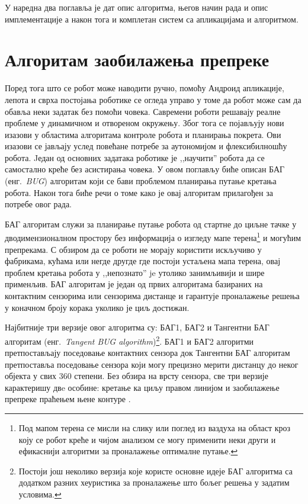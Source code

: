 \documentclass[12pt,oneside]{memoir}
\theoremstyle{remark}
\begin{document}
У наредна два поглавља је дат опис алгоритма, његов начин рада и опис имплементације а након тога и комплетан систем са апликацијама и алгоритмом.

\chapter{Алгоритам заобилажења препреке}
\label{chp:algoritam}
Поред тога што се робот може наводити ручно, помоћу Андроид апликације, лепота и сврха постојања роботике се огледа управо у томе да робот може сам да обавља неки задатак без помоћи човека. Савремени роботи решавају реалне проблеме у динамичном и отвореном окружењу. Због тога се појављују нови изазови у областима алгоритама контроле робота и планирања покрета. Ови изазови се јављају услед повећане потребе за аутономијом и флексибилношћу робота. Jедан од основних задатака роботике је ,,научити'' робота да се самостално креће без асистирања човека. У овом поглављу биће описан БАГ (енг.~{\em BUG}) алгоритам који се бави проблемом планирања путање кретања робота. Након тога биће речи о томе како је овај алгоритам прилагођен за потребе овог рада.

БАГ алгоритам служи за планирање путање робота од стартне до циљне тачке у дводимензионалном простору без информација о изгледу мапе терена\footnote{Под мапом терена се мисли на слику или поглед из ваздуха на област кроз коју се робот креће и чијом анализом се могу применити неки други и ефикаснији алгоритми за проналажење оптималне путање.} и могућим препрекама. С обзиром да се роботи не морају користити искључиво у фабрикама, кућама или негде другде где постоји устаљена мапа терена, овај проблем кретања робота у ,,непознато'' je утолико занимљивији и шире применљив. БАГ алгоритам је један од првих алгоритама  базираних на контактним сензорима или сензорима дистанце и гарантује проналажење решења у коначном броју корака уколико је циљ достижан. 

Најбитније три верзије овог алгоритма су: БАГ1, БАГ2 и Тангентни БАГ алгоритам (енг.~{\em Tangent BUG algorithm})\footnote{Постоји још неколико верзија које користе основне идеје БАГ алгоритма са додатком разних хеуристика за проналажење што бољег решења у задатим условима.}. БАГ1 и БАГ2 алгоритми претпостављају поседовање контактних сензора док Тангентни БАГ алгоритам претпоставља поседовање сензора који могу прецизно мерити дистанцу до неког објекта у свих 360 степени. Без обзира на врсту сензора, све три верзије карактеришу двe особине: кретање ка циљу правом линијом и заобилажење препреке праћењем њене контуре \cite{principlesofrobotmotion}. 
\end{document}
